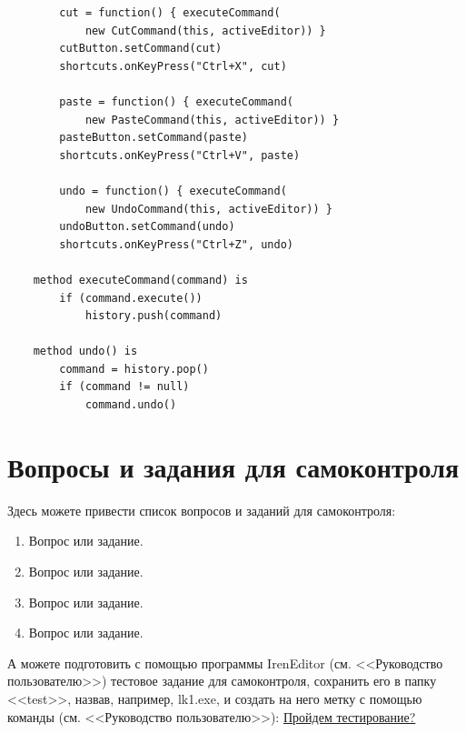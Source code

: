 \begin{lstlisting}
        cut = function() { executeCommand(
            new CutCommand(this, activeEditor)) }
        cutButton.setCommand(cut)
        shortcuts.onKeyPress("Ctrl+X", cut)

        paste = function() { executeCommand(
            new PasteCommand(this, activeEditor)) }
        pasteButton.setCommand(paste)
        shortcuts.onKeyPress("Ctrl+V", paste)

        undo = function() { executeCommand(
            new UndoCommand(this, activeEditor)) }
        undoButton.setCommand(undo)
        shortcuts.onKeyPress("Ctrl+Z", undo)

    method executeCommand(command) is
        if (command.execute())
            history.push(command)

    method undo() is
        command = history.pop()
        if (command != null)
            command.undo()
\end{lstlisting}

\section*{Вопросы и задания для самоконтроля}%

Здесь можете привести список вопросов и заданий для самоконтроля:
\begin{enumerate}%
\item Вопрос или задание.
\item Вопрос или задание.
\item Вопрос или задание.
\item Вопрос или задание.
\end{enumerate}%

А можете подготовить с помощью программы IrenEditor (см. <<Руководство пользователю>>)
тестовое задание для самоконтроля, сохранить его в папку
<<test>>, назвав, например, lk1.exe, и создать на него метку с помощью
команды (см. <<Руководство пользователю>>): \href{run:test/lk1.exe}{Пройдем тестирование?}
